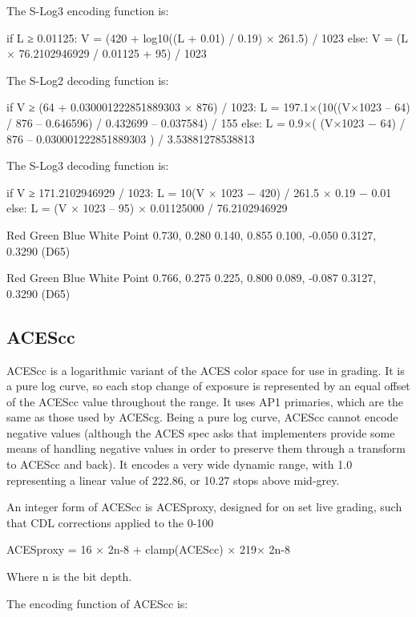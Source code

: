 The S-Log3 encoding function is:

	if L ≥ 0.01125:
		V = (420 + log10((L + 0.01) / 0.19) × 261.5) / 1023
	else:
		V = (L × 76.2102946929 / 0.01125 + 95) / 1023


The S-Log2 decoding function is:

	if V ≥ (64 + 0.030001222851889303 × 876) / 1023:
		L = 197.1×(10((V×1023 – 64) / 876 – 0.646596) / 0.432699  – 0.037584) / 155
	else:
		L = 0.9×( (V×1023 − 64) / 876 – 0.030001222851889303 ) / 3.53881278538813

The S-Log3 decoding function is:

	if V ≥ 171.2102946929 / 1023:
		L = 10(V × 1023 − 420) / 261.5 × 0.19 − 0.01
	else:
		L = (V × 1023 – 95) × 0.01125000 / 76.2102946929



Red
Green
Blue
White Point
0.730, 0.280
0.140, 0.855
0.100, -0.050
0.3127, 0.3290 (D65)


Red
Green
Blue
White Point
0.766, 0.275
0.225, 0.800
0.089, -0.087
0.3127, 0.3290 (D65)

\subsection{ACEScc}

ACEScc is a logarithmic variant of the ACES color space for use in grading. It is a pure log curve, so each stop change of exposure is represented by an equal offset of the ACEScc value throughout the range. It uses AP1 primaries, which are the same as those used by ACEScg. Being a pure log curve, ACEScc cannot encode negative values (although the ACES spec asks that implementers provide some means of handling negative values in order to preserve them through a transform to ACEScc and back). It encodes a very wide dynamic range, with 1.0 representing a linear value of 222.86, or 10.27 stops above mid-grey.

An integer form of ACEScc is ACESproxy, designed for on set live grading, such that CDL corrections applied to the 0-100%

	ACESproxy = 16 × 2n-8 + clamp(ACEScc) × 219× 2n-8

Where n is the bit depth.

The encoding function of ACEScc is:

